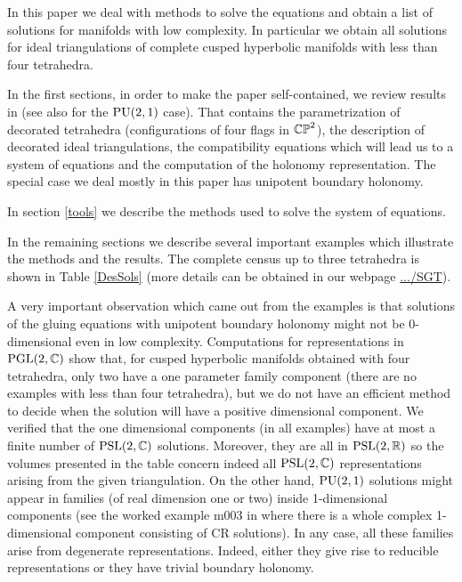 In this paper we deal with methods to solve the equations and obtain a list of solutions for manifolds with low complexity.  In particular we obtain all
solutions for ideal triangulations of complete cusped hyperbolic manifolds with less than four tetrahedra.

In the first sections, in order to make the paper self-contained,  we review results in \cite{BFG} (see also \cite{falbeleight} for the $\textrm{PU}(2,1)$ case).  That contains the parametrization of decorated tetrahedra (configurations of four flags in $\mathbb{CP}^2$),  the  description of decorated ideal triangulations, the compatibility equations
which will lead us to a system of equations and the computation of the holonomy representation.  The special case we deal mostly in this paper has unipotent boundary holonomy.

In section \ref{tools} we describe the methods used to solve the system of equations.

In the remaining sections we describe several important examples which illustrate the methods and the results.
 The complete census up to three tetrahedra is shown in Table \ref{DesSols} (more details can be obtained in our webpage \href{https://who.rocq.inria.fr/Fabrice.Rouillier/SGT/Home_page.html}{.../SGT}).

A very important observation which came out from the examples is that solutions of the gluing equations with unipotent boundary holonomy might not be 0-dimensional
even in low complexity.  Computations for representations in $\textrm{PGL}(2,\mathbb{C})$ show that, for cusped hyperbolic manifolds obtained with  four tetrahedra, only two have a one parameter family component (there are no examples with less than four tetrahedra), but we do not have an efficient method to decide when the solution will have
a positive dimensional component.
We verified that the one dimensional components (in all examples) have at most a finite number of $\mathrm{PSL}(2,\mathbb{C})$ solutions. Moreover, they are all in $\mathrm{PSL}(2,\mathbb{R})$ so the volumes presented in the table concern indeed all $\mathrm{PSL}(2,\mathbb{C})$ representations arising from the given triangulation.
On the other hand, $\textrm{PU}(2,1)$ solutions might appear in families (of real dimension one or two) inside 1-dimensional  components (see the worked example m003 in \cite{BFGKR} where there is a whole complex 1-dimensional component consisting of CR solutions).   In any case, all these families arise from degenerate representations.  Indeed, either
they give rise to reducible representations or they have trivial boundary holonomy.

